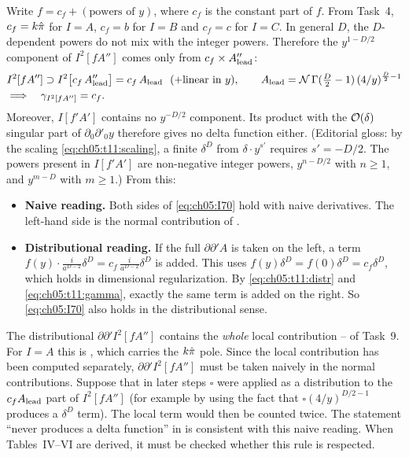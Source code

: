 Write $f=c_f+(\text{powers of }y)$, where $c_f$ is the constant part of $f$.
From Task~4, $c_f=k\hat\pi$ for $I=A$, $c_f=b$ for $I=B$ and $c_f=c$ for $I=C$.
In general $D$, the $D$-dependent powers do not mix with the integer powers. Therefore the $y^{1-D/2}$ component of $I^2[fA'']$ comes only from $c_f\times A_{\rm lead}''$:
\begin{equation}
\begin{aligned}
&I^2[fA'']\supset I^2\big[c_f\,\chVlead''\big]=c_f\,\chVlead\ \ (+\text{linear in }y),\qquad \chVlead=\mathcal N\,\Gamma(\tfrac D2-1)\,(4/y)^{\frac D2-1}\\
&\Longrightarrow\quad\gamma_{I^2[fA'']}=c_f .
\end{aligned}
\label{eq:ch05:t11:gamma}
\end{equation}
Moreover, $I[f'A']$ contains no $y^{-D/2}$ component. Its product with the $\mathcal{O}\!\left(\delta\right)$ singular part of $\partial_0\partial'_0y$ therefore gives no delta function either.
(Editorial gloss: by the scaling \eqref{eq:ch05:t11:scaling}, a finite $\delta^D$ from $\delta\cdot y^{s'}$ requires $s'=-D/2$. The powers present in $I[f'A']$ are non-negative integer powers, $y^{n-D/2}$ with $n\geq1$, and $y^{m-D}$ with $m\geq1$.)
From this:
\begin{itemize}[leftmargin=14pt]
\item \textbf{Naive reading.} Both sides of \eqref{eq:ch05:I70} hold with naive derivatives. The left-hand side is the normal contribution of .
\item \textbf{Distributional reading.} If the full $\partial\partial'A$ is taken on the left, a term $f(y)\cdot\frac{i}{a^{D-2}}\delta^D=c_f\,\frac{i}{a^{D-2}}\delta^D$ is added.
This uses $f(y)\delta^D=f(0)\delta^D=c_f\delta^D$, which holds in dimensional regularization.
By \eqref{eq:ch05:t11:distr} and \eqref{eq:ch05:t11:gamma}, exactly the same term is added on the right. So \eqref{eq:ch05:I70} also holds in the distributional sense.
\end{itemize}
\begin{discbox}
The distributional $\partial\partial'I^2[fA'']$ contains the \emph{whole} local contribution -- of Task~9.
For $I=A$ this is , which carries the $k\hat\pi$ pole.
Since the local contribution has been computed separately, $\partial\partial'I^2[fA'']$ must be taken naively in the normal contributions.
Suppose that in later steps $\square$ were applied as a distribution to the $c_fA_{\rm lead}$ part of $I^2[fA'']$ (for example by using the fact that $\square(4/y)^{D/2-1}$ produces a $\delta^D$ term).
The local term would then be counted twice.
The statement ``never produces a delta function'' in  is consistent with this naive reading.
When Tables~IV--VI are derived, it must be checked whether this rule is respected.
\end{discbox}


